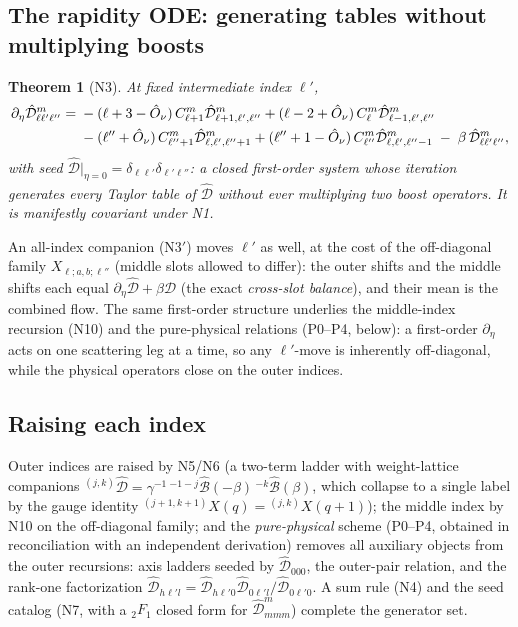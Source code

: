 \documentclass[useAMS,usenatbib]{article}
\newcommand{\Oh}{\hat{O}_\nu}
\newcommand{\Bo}{\hat{\mathcal{B}}}
\newcommand{\Do}{\hat{\mathcal{D}}}
\newtheorem{theorem}{Theorem}
\begin{document}
\subsection{The rapidity ODE: generating tables without multiplying boosts}
\begin{theorem}[N3]
At fixed intermediate index $\ell'$,
\begin{align}
  \partial_\eta \Do^m_{\ell\ell'\ell''} =\;
   &-(\ell+3-\Oh)\,C^m_{\ell+1}\Do^m_{\ell+1,\ell',\ell''}
    +(\ell-2+\Oh)\,C^m_{\ell}\Do^m_{\ell-1,\ell',\ell''}\notag\\
   &-(\ell''+\Oh)\,C^m_{\ell''+1}\Do^m_{\ell,\ell',\ell''+1}
    +(\ell''+1-\Oh)\,C^m_{\ell''}\Do^m_{\ell,\ell',\ell''-1}
    \;-\;\beta\,\Do^m_{\ell\ell'\ell''},
  \label{eq:n3}
\end{align}
with seed $\Do|_{\eta=0} = \delta_{\ell\ell'}\delta_{\ell'\ell''}$: a closed first-order system whose iteration
generates every Taylor table of $\Do$ \emph{without ever multiplying two boost operators}. It is manifestly
covariant under N1.
\end{theorem}
An all-index companion (N3$'$) moves $\ell'$ as well, at the cost of the off-diagonal family
$X_{\ell;a,b;\ell''}$ (middle slots allowed to differ): the outer shifts and the middle shifts each equal
$\partial_\eta\Do + \beta\Do$ (the exact \emph{cross-slot balance}), and their mean is the combined flow.
The same first-order structure underlies the middle-index recursion (N10) and the pure-physical relations
(P0--P4, below): a first-order $\partial_\eta$ acts on one scattering leg at a time, so any $\ell'$-move is
inherently off-diagonal, while the physical operators close on the outer indices.

\subsection{Raising each index}
Outer indices are raised by N5/N6 (a two-term ladder with weight-lattice companions
${}^{(j,k)}\Do = \gamma^{-1}\,{}^{-1-j}\Bo(-\beta)\,{}^{-k}\Bo(\beta)$, which collapse to a single label by the
gauge identity ${}^{(j+1,k+1)}X(q) = {}^{(j,k)}X(q+1)$); the middle index by N10 on the off-diagonal family; and
the \emph{pure-physical} scheme (P0--P4, obtained in reconciliation with an independent derivation) removes all
auxiliary objects from the outer recursions: axis ladders seeded by $\Do_{000}$,
the outer-pair relation, and the rank-one factorization
$\Do_{h\ell'l} = \Do_{h\ell'0}\Do_{0\ell'l}/\Do_{0\ell'0}$. A sum rule (N4) and the seed catalog (N7, with a
${}_2F_1$ closed form for $\Do^m_{mmm}$) complete the generator set.
\end{document}

